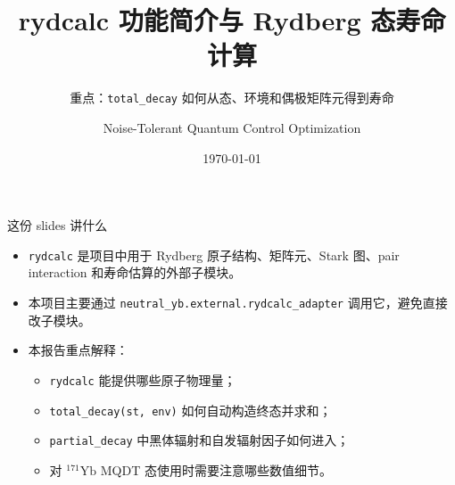 \documentclass[aspectratio=169,11pt]{ctexbeamer}
\title[rydcalc 与寿命计算]{rydcalc 功能简介与 Rydberg 态寿命计算}
\subtitle{重点：\texttt{total\_decay} 如何从态、环境和偶极矩阵元得到寿命}
\author{Noise-Tolerant Quantum Control Optimization}
\date{\today}
\begin{document}
\begin{frame}
  \titlepage
\end{frame}

\begin{frame}{这份 slides 讲什么}
  \begin{itemize}
    \item \texttt{rydcalc} 是项目中用于 Rydberg 原子结构、矩阵元、Stark 图、pair interaction 和寿命估算的外部子模块。
    \item 本项目主要通过 \texttt{neutral\_yb.external.rydcalc\_adapter} 调用它，避免直接改子模块。
    \item 本报告重点解释：
      \begin{itemize}
        \item \texttt{rydcalc} 能提供哪些原子物理量；
        \item \texttt{total\_decay(st, env)} 如何自动构造终态并求和；
        \item \texttt{partial\_decay} 中黑体辐射和自发辐射因子如何进入；
        \item 对 \({}^{171}\mathrm{Yb}\) MQDT 态使用时需要注意哪些数值细节。
      \end{itemize}
  \end{itemize}
\end{frame}
\end{document}
